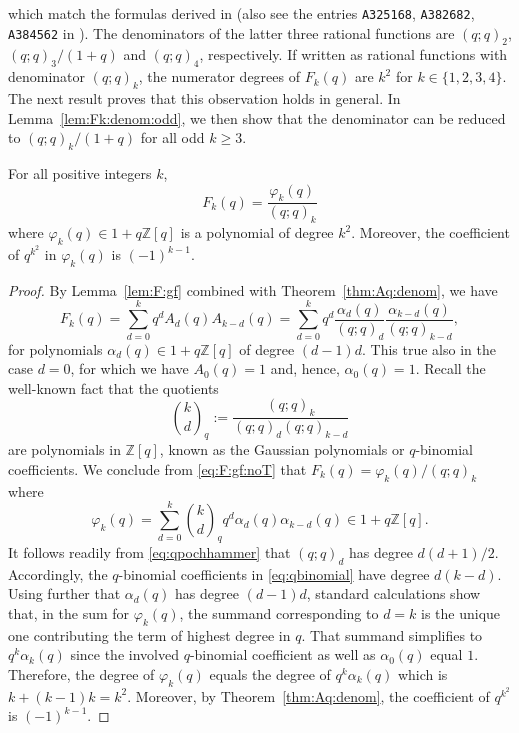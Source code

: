 \documentclass[11pt]{article}
\theoremstyle{plain}
\theoremstyle{definition}
\newcommand{\assign}{:=}
\newcommand{\tmtt}[1]{\texttt{#1}}
\begin{document}
which match the formulas derived in \cite{sharan-rook} (also see the entries
{\tmtt{A325168}}, {\tmtt{A382682}}, {\tmtt{A384562}} in \cite{sloane-oeis}).
The denominators of the latter three rational functions are $(q ; q)_2$, $(q ;
q)_3 / (1 + q)$ and $(q ; q)_4$, respectively. If written as rational
functions with denominator $(q ; q)_k$, the numerator degrees of $F_k (q)$ are
$k^2$ for $k \in \{ 1, 2, 3, 4 \}$. The next result proves that this
observation holds in general. In Lemma~\ref{lem:Fk:denom:odd}, we then show
that the denominator can be reduced to $(q ; q)_k / (1 + q)$ for all odd $k
\geq 3$.

\begin{theorem}
  \label{thm:Fk:denom}For all positive integers $k$,
  \begin{equation}
    F_k (q) = \frac{\varphi_k (q)}{(q ; q)_k} \label{eq:Fk:denom}
  \end{equation}
  where $\varphi_k (q) \in 1 + q\mathbb{Z} [q]$ is a polynomial of degree
  $k^2$. Moreover, the coefficient of $q^{k^2}$ in $\varphi_k (q)$ is $(-
  1)^{k - 1}$.
\end{theorem}

\begin{proof}
  By Lemma~\ref{lem:F:gf} combined with Theorem~\ref{thm:Aq:denom}, we have
  \begin{equation}
    F_k (q) = \sum_{d = 0}^k q^d A_d (q) A_{k - d} (q) = \sum_{d = 0}^k q^d 
    \frac{\alpha_d (q)}{(q ; q)_d}  \frac{\alpha_{k - d} (q)}{(q ; q)_{k -
    d}}, \label{eq:F:gf:noT}
  \end{equation}
  for polynomials $\alpha_d (q) \in 1 + q\mathbb{Z} [q]$ of degree $(d - 1)
  d$. This true also in the case $d = 0$, for which we have $A_0 (q) = 1$ and,
  hence, $\alpha_0 (q) = 1$. Recall the well-known fact that the quotients
  \begin{equation}
    \binom{k}{d}_q \assign \frac{(q ; q)_k}{(q ; q)_d (q ; q)_{k - d}}
    \label{eq:qbinomial}
  \end{equation}
  are polynomials in $\mathbb{Z} [q]$, known as the Gaussian polynomials or
  $q$-binomial coefficients. We conclude from \eqref{eq:F:gf:noT} that $F_k
  (q) = \varphi_k (q) / (q ; q)_k$ where
  \begin{equation}
    \varphi_k (q) = \sum_{d = 0}^k \binom{k}{d}_q q^d \alpha_d (q) \alpha_{k -
    d} (q) \in 1 + q\mathbb{Z} [q] . \label{eq:phik:alpha}
  \end{equation}
  It follows readily from \eqref{eq:qpochhammer} that $(q ; q)_d$ has degree
  $d (d + 1) / 2$. Accordingly, the $q$-binomial coefficients in
  \eqref{eq:qbinomial} have degree $d (k - d)$. Using further that $\alpha_d
  (q)$ has degree $(d - 1) d$, standard calculations show that, in the sum for
  $\varphi_k (q)$, the summand corresponding to $d = k$ is the unique one
  contributing the term of highest degree in $q$. That summand simplifies to
  $q^k \alpha_k (q)$ since the involved $q$-binomial coefficient as well as
  $\alpha_0 (q)$ equal $1$. Therefore, the degree of $\varphi_k (q)$ equals
  the degree of $q^k \alpha_k (q)$ which is $k + (k - 1) k = k^2$. Moreover,
  by Theorem~\ref{thm:Aq:denom}, the coefficient of $q^{k^2}$ is $(- 1)^{k -
  1}$.
\end{proof}
\end{document}
